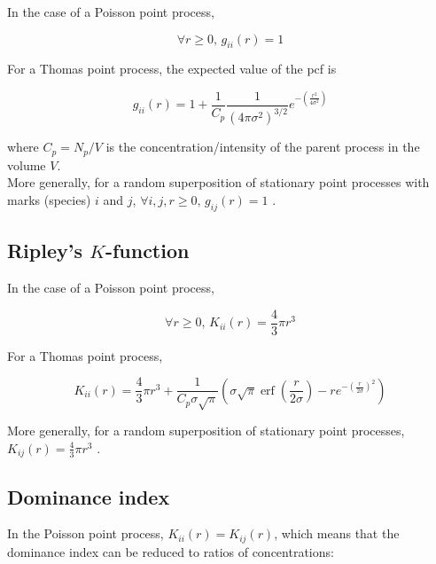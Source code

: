 \documentclass[english]{article}
\DeclareMathOperator\erf{erf}
\begin{document}
In the case of a Poisson point process,

\begin{equation}
\forall r\geq0\text{, }g_{ii}(r)=1
\end{equation}

For a Thomas point process, the expected value of the pcf is

\begin{equation}
g_{ii}(r)=1+\frac{1}{C_{p}}\frac{1}{\left(4\pi\sigma^{2}\right)^{3/2}}e^{-\left(\frac{r^{2}}{4\sigma^{2}}\right)}
\end{equation}

where $C_{p}=N_{p}/V$ is the concentration/intensity of the parent
process in the volume $V$.\\

More generally, for a random superposition of stationary point processes
with marks (species) $i$ and $j$, $\forall i,j,r\geq0\text{, }g_{ij}(r)=1$
\citep[ p. 326, eq. 5.3.13]{illian2008statistical}.

\subsection{Ripley's $K$-function}

In the case of a Poisson point process,

\begin{equation}
\forall r\geq0\text{, }K_{ii}(r)=\frac{4}{3}\pi r^{3}\label{eq:k_poisson}
\end{equation}

For a Thomas point process, 

\begin{equation}
K_{ii}(r)=\frac{4}{3}\pi r^{3}+\frac{1}{C_{p}\sigma\sqrt{\pi}}\left(\sigma\sqrt{\pi}\erf\left(\frac{r}{2\sigma}\right)-re^{-\left(\frac{r}{2\sigma}\right)^{2}}\right)\label{eq:k_thomas}
\end{equation}

More generally, for a random superposition of stationary point processes,
$K_{ij}(r)=\frac{4}{3}\pi r^{3}$ \citep[p. 324, eq. 5.3.5]{illian2008statistical}.

\subsection{Dominance index}

In the Poisson point process, $K_{ii}(r)=K_{ij}(r)$, which means
that the dominance index can be reduced to ratios of concentrations:
\end{document}
